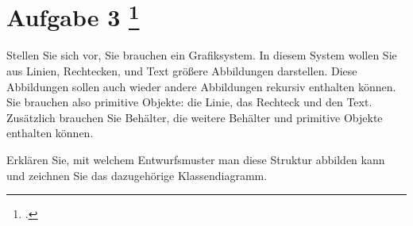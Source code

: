 \documentclass{bschlangaul-aufgabe}
\begin{document}

\section{Aufgabe 3
\footcite{sosy:ab:6}}

Stellen Sie sich vor, Sie brauchen ein Grafiksystem. In diesem System
wollen Sie aus Linien, Rechtecken, und Text größere Abbildungen
darstellen. Diese Abbildungen sollen auch wieder andere Abbildungen
rekursiv enthalten können. Sie brauchen also primitive Objekte: die
Linie, das Rechteck und den Text. Zusätzlich brauchen Sie Behälter, die
weitere Behälter und primitive Objekte enthalten können.

Erklären Sie, mit welchem Entwurfsmuster man diese Struktur abbilden
kann und zeichnen Sie das dazugehörige Klassendiagramm.
\end{document}
